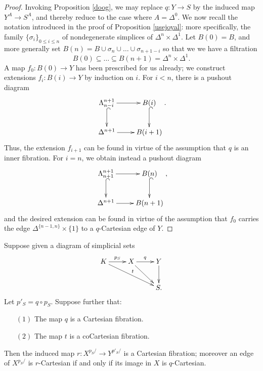 \begin{proof}
Invoking Proposition \ref{doog}, we may replace $q: Y \rightarrow S$ by the induced map
$Y^A \rightarrow S^A$, and thereby reduce to the case where $A = \Delta^0$. 
We now recall the notation introduced in the proof of Proposition \ref{usejoyal}: more specifically, the family $\{ \sigma_i\}_{ 0 \leq i \leq n}$ of nondegenerate simplices of $\Delta^n \times \Delta^1$.
Let $B(0) = B$, and more generally set $B(n) = B \cup \sigma_n \cup \ldots \cup \sigma_{n+1-i}$
so that we we have a filtration
$$ B(0) \subseteq \ldots \subseteq B(n+1) = \Delta^n \times \Delta^1.$$
A map $f_0: B(0) \rightarrow Y$ has been prescribed for us already; we construct extensions $f_i: B(i) \rightarrow Y$ by induction on $i$. For $i < n$, there is a pushout diagram
$$ \xymatrix{ \Lambda^{n+1}_{n-i} \ar[r] \ar@{^{(}->}[d] & B(i) \ar@{^{(}->}[d] \\
\Delta^{n+1} \ar[r] & B(i+1) }.$$
Thus, the extension $f_{i+1}$ can be found in virtue of the assumption that $q$ is an inner fibration. For $i = n$, we obtain instead a pushout diagram
$$ \xymatrix{ \Lambda^{n+1}_{n+1} \ar[r] \ar@{^{(}->}[d] & B(n) \ar@{^{(}->}[d] \\
\Delta^{n+1} \ar[r] & B(n+1) },$$
and the desired extension can be found in virtue of the assumption that $f_0$ carries the edge $\Delta^{ \{n-1,n\}} \times \{1\}$ to a $q$-Cartesian edge of $Y$.
\end{proof}

\begin{proposition}\label{colimfam}
Suppose given a diagram of simplicial sets
$$ \xymatrix{ K \ar[drr]^{t} \ar[r]^{p_S} & X \ar[r]^{q} \ar[dr] & Y \ar[d] \\
& & S. }$$
Let $p'_{S} = q \circ p_{S}$. Suppose further that:
\begin{itemize}
\item[$(1)$] The map $q$ is a Cartesian fibration.
\item[$(2)$] The map $t$ is a coCartesian fibration.
\end{itemize}
Then the induced map $r: X^{p_S/} \rightarrow Y^{p'_S/}$ is a Cartesian fibration; moreover an edge of $X^{p_S/}$ is $r$-Cartesian if and only if its image in $X$ is $q$-Cartesian.
\end{proposition}

